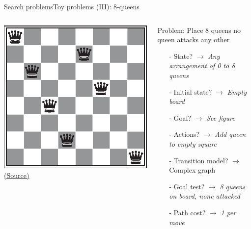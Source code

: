 \documentclass[10pt,compress]{beamer} %
\begin{document}
\begin{frame}{Search problems}{Toy problems (III): 8-queens}
       \begin{columns}
	            \centering \includegraphics[width=\linewidth]{figs/8queens.eps}\\
	            \tiny{\href{http://aima.cs.berkeley.edu/index.html}{(Source)}}
                \begin{exampleblock}{Problem: Place 8 queens no queen attacks any other}
                    \begin{itemize}
                    \item[-] State? $\rightarrow$ \textit{Any arrangement of 0 to 8 queens}
                    \item[-] Initial state? $\rightarrow$ \textit{Empty board}
                    \item[-] Goal? $\rightarrow$ \textit{See figure}
                    \item[-] Actions? $\rightarrow$ \textit{Add queen to empty square}
                    \item[-] Transition model? $\rightarrow$ Complex graph
                    \item[-] Goal test? $\rightarrow$ \textit{8 queens on board, none attacked}
                    \item[-] Path cost? $\rightarrow$ \textit{1 per move}
                    \end{itemize}
                \end{exampleblock}
      \end{columns}
\end{frame}
\end{document}
